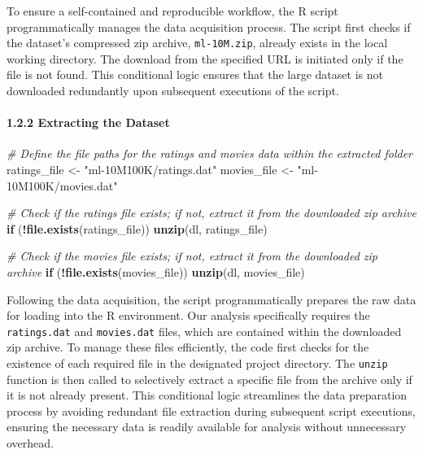 \documentclass[
]{article}
\newenvironment{Shaded}{\begin{snugshade}}{\end{snugshade}}
\newcommand{\CommentTok}[1]{\textcolor[rgb]{0.56,0.35,0.01}{\textit{#1}}}
\newcommand{\ControlFlowTok}[1]{\textcolor[rgb]{0.13,0.29,0.53}{\textbf{#1}}}
\newcommand{\FunctionTok}[1]{\textcolor[rgb]{0.13,0.29,0.53}{\textbf{#1}}}
\newcommand{\NormalTok}[1]{#1}
\newcommand{\OtherTok}[1]{\textcolor[rgb]{0.56,0.35,0.01}{#1}}
\newcommand{\SpecialCharTok}[1]{\textcolor[rgb]{0.81,0.36,0.00}{\textbf{#1}}}
\newcommand{\StringTok}[1]{\textcolor[rgb]{0.31,0.60,0.02}{#1}}
\begin{document}
To ensure a self-contained and reproducible workflow, the R script
programmatically manages the data acquisition process. The script first
checks if the dataset's compressed zip archive, \texttt{ml-10M.zip},
already exists in the local working directory. The download from the
specified URL is initiated only if the file is not found. This
conditional logic ensures that the large dataset is not downloaded
redundantly upon subsequent executions of the script.

\paragraph{1.2.2 Extracting the Dataset}\label{extracting-the-dataset}

\begin{Shaded}
\begin{Highlighting}[]
\CommentTok{\# Define the file paths for the ratings and movies data within the extracted folder}
\NormalTok{ratings\_file }\OtherTok{\textless{}{-}} \StringTok{"ml{-}10M100K/ratings.dat"}
\NormalTok{movies\_file  }\OtherTok{\textless{}{-}} \StringTok{"ml{-}10M100K/movies.dat"}

\CommentTok{\# Check if the ratings file exists; if not, extract it from the downloaded zip archive}
\ControlFlowTok{if}\NormalTok{ (}\SpecialCharTok{!}\FunctionTok{file.exists}\NormalTok{(ratings\_file)) }\FunctionTok{unzip}\NormalTok{(dl, ratings\_file)}

\CommentTok{\# Check if the movies file exists; if not, extract it from the downloaded zip archive}
\ControlFlowTok{if}\NormalTok{ (}\SpecialCharTok{!}\FunctionTok{file.exists}\NormalTok{(movies\_file)) }\FunctionTok{unzip}\NormalTok{(dl, movies\_file)}
\end{Highlighting}
\end{Shaded}

Following the data acquisition, the script programmatically prepares the
raw data for loading into the R environment. Our analysis specifically
requires the \texttt{ratings.dat} and \texttt{movies.dat} files, which
are contained within the downloaded zip archive. To manage these files
efficiently, the code first checks for the existence of each required
file in the designated project directory. The \texttt{unzip} function is
then called to selectively extract a specific file from the archive only
if it is not already present. This conditional logic streamlines the
data preparation process by avoiding redundant file extraction during
subsequent script executions, ensuring the necessary data is readily
available for analysis without unnecessary overhead. \newpage
\end{document}
